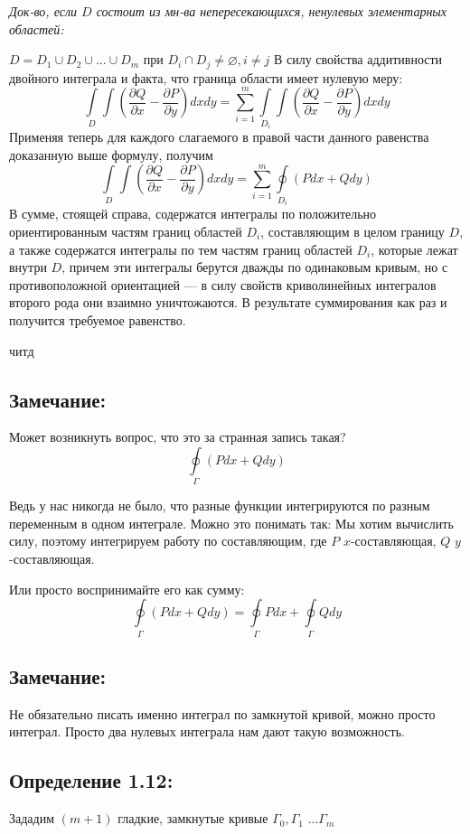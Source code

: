 \documentclass[12pt]{article}
\begin{document}
\textit{Док-во, если $D$ состоит из мн-ва непересекающихся, ненулевых элементарных областей:}

$
D = D_1 \cup D_2 \cup ... \cup D_m $ при $ D_i \cap D_j \neq  \varnothing, i \neq j
$
В силу свойства аддитивности двойного интеграла и факта, что граница области имеет нулевую меру:
$$
\int\limits_D \int (\frac{\partial Q}{\partial x} - \frac{\partial P}{\partial y}) dxdy
=
\sum_{i=1}^{m} \int\limits_{D_i} \int (\frac{\partial Q}{\partial x} - \frac{\partial P}{\partial y}) dxdy
$$
Применяя теперь для каждого слагаемого в правой части данного равенства доказанную выше формулу, получим
$$
\int\limits_D \int (\frac{\partial Q}{\partial x} - \frac{\partial P}{\partial y}) dxdy
= 
\sum_{i=1}^{m} \oint\limits_{D_i} (Pdx + Qdy) 
$$
В сумме, стоящей справа, содержатся интегралы по положительно ориентированным частям границ областей $D_i$, составляющим в целом границу $D$,
а также содержатся интегралы по тем частям границ областей  $D_i$, которые
лежат внутри  $D$, причем эти интегралы берутся дважды по одинаковым
кривым, но с противоположной ориентацией — в силу свойств криволинейных интегралов второго рода они взаимно уничтожаются. В результате
суммирования как раз и получится требуемое равенство.

читд
\subsection*{Замечание:}
Может возникнуть вопрос, что это за странная запись такая? 
$$
\oint\limits_{\Gamma}(Pdx + Qdy)
$$

Ведь у нас никогда не было, что разные функции интегрируются по разным переменным в одном интеграле. Можно это понимать так: Мы хотим вычислить силу, поэтому интегрируем работу по составляющим, где $P$ $x$-составляющая, $Q$ $y$-составляющая.
	
Или просто воспринимайте его как сумму:
$$
\oint\limits_{\Gamma} (Pdx + Qdy) =
\oint\limits_{\Gamma}Pdx + \oint\limits_{\Gamma} Qdy
$$

\subsection*{Замечание:}
	Не обязательно писать именно интеграл по замкнутой кривой, можно просто интеграл. Просто два нулевых интеграла нам дают такую возможность.
\newpage

\subsection*{Определение 1.12:}
	Зададим $(m+1)$ гладкие, замкнутые кривые $\Gamma_0 , \Gamma_1$ ...$\Gamma_m $
	
\end{document}
